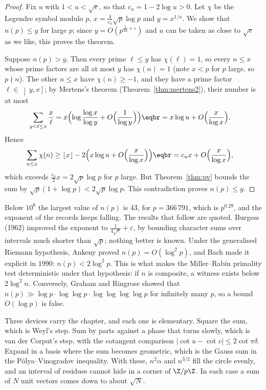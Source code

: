 \begin{proof}
Fix $u$ with $1<u<\sqrt e$, so that $c_u=1-2\log u>0$. Let $\chi$ be the Legendre symbol modulo $p$, $x=\frac4{c_u}\sqrt p\log p$ and $y=x^{1/u}$. We show that $n(p)\le y$ for large $p$; since $y=O(p^{\frac1{2u}+\varepsilon})$
and $u$ can be taken as close to $\sqrt e$ as we like, this proves the theorem.

Suppose $n(p)>y$. Then every prime $\ell\le y$ has $\chi(\ell)=1$, so every $n\le x$ whose prime factors are all at most $y$ has $\chi(n)=1$ (note $x<p$ for $p$ large, so $p\nmid n$). The other $n\le x$ have
$\chi(n)\ge-1$, and they have a prime factor $\ell\in\left]y,x\right]$; by Mertens's theorem (Theorem~\ref{thm:mertens2}), their number is at most
\[
\begin{aligned}\sum_{y<\ell\le x}\frac x\ell&=x\Bigl(\log\frac{\log x}{\log y}+O\Bigl(\frac1{\log y}\Bigr)\Bigr)\eqbr=x\log u+O\Bigl(\frac x{\log x}\Bigr).\end{aligned}
\]
Hence
\[
\begin{aligned}\sum_{n\le x}\chi(n)&\ge\lfloor x\rfloor-2\Bigl(x\log u+O\Bigl(\frac x{\log x}\Bigr)\Bigr)\eqbr=c_ux+O\Bigl(\frac x{\log x}\Bigr),\end{aligned}
\]
which exceeds $\frac{c_u}2x=2\sqrt p\log p$ for $p$ large. But Theorem~\ref{thm:pv} bounds the sum by $\sqrt p(1+\log p)<2\sqrt p\log p$. This contradiction proves $n(p)\le y$.
\end{proof}

\begin{remark}
Below $10^6$ the largest value of $n(p)$ is $43$, for $p=366\,791$, which is $p^{0.29}$, and the exponent of the records keeps falling. The results that follow are quoted. Burgess (1962) improved the exponent to $\frac1{4\sqrt e}+\varepsilon$, by bounding character
sums over intervals much shorter than $\sqrt p$; nothing better is known. Under the generalised Riemann hypothesis, Ankeny proved $n(p)=O(\log^2p)$, and Bach made it explicit in 1990: $n(p)<2\log^2p$. This is
what makes the Miller--Rabin primality test deterministic under that hypothesis: if $n$ is composite, a witness exists below $2\log^2n$. Conversely, Graham and Ringrose showed that $n(p)\gg\log p\cdot\log\log p\cdot\log\log\log\log p$ for infinitely many $p$, so a bound $O(\log p)$ is false.
\end{remark}

\begin{beauty}
Three devices carry the chapter, and each one is elementary. Square the sum, which is Weyl's step. Sum by parts against a phase that turns slowly, which is van der Corput's step, with the cotangent comparison $|\cot u-\cot v|\le 2\cot\pi\delta$. Expand in a basis where the sum becomes geometric, which is the Gauss sum in the Pólya--Vinogradov inequality. With these, $n^2\alpha$ and $n^{3/2}$ fill the circle evenly, and an interval of residues cannot hide in a corner of $\Z/p\Z$. In each case a sum of $N$ unit vectors comes down to about $\sqrt N$.
\end{beauty}

